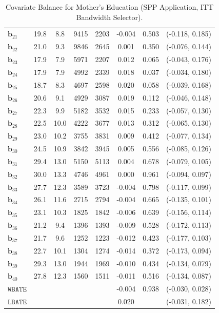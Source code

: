 \documentclass[10pt]{article}
\newcommand{\bb}{\mathbf{b}}
\begin{document}
\begin{table}[p]
\begin{tabular}{lccccccc}
   $\bb_{21}$ & 19.8 & 8.8 & 9415 & 2203 & -0.004 & 0.503 & (-0.118, 0.185)\\
   $\bb_{22}$ & 21.0 & 9.3 & 9846 & 2645 & 0.001 & 0.350 & (-0.076, 0.144)\\
   $\bb_{23}$ & 17.9 & 7.9 & 5971 & 2207 & 0.012 & 0.065 & (-0.043, 0.176)\\
   $\bb_{24}$ & 17.9 & 7.9 & 4992 & 2339 & 0.018 & 0.037 & (-0.034, 0.180)\\
   $\bb_{25}$ & 18.7 & 8.3 & 4697 & 2598 & 0.020 & 0.058 & (-0.039, 0.168)\\
   $\bb_{26}$ & 20.6 & 9.1 & 4929 & 3087 & 0.019 & 0.112 & (-0.046, 0.148)\\
   $\bb_{27}$ & 22.3 & 9.9 & 5182 & 3532 & 0.015 & 0.233 & (-0.057, 0.130)\\
   $\bb_{28}$ & 22.5 & 10.0 & 4222 & 3677 & 0.013 & 0.312 & (-0.065, 0.130)\\
   $\bb_{29}$ & 23.0 & 10.2 & 3755 & 3831 & 0.009 & 0.412 & (-0.077, 0.134)\\
   $\bb_{30}$ & 24.5 & 10.9 & 3842 & 3945 & 0.005 & 0.556 & (-0.085, 0.126)\\
   $\bb_{31}$ & 29.4 & 13.0 & 5150 & 5113 & 0.004 & 0.678 & (-0.079, 0.105)\\
   $\bb_{32}$ & 30.0 & 13.3 & 4746 & 4961 & 0.000 & 0.961 & (-0.094, 0.097)\\
   $\bb_{33}$ & 27.7 & 12.3 & 3589 & 3723 & -0.004 & 0.798 & (-0.117, 0.099)\\
   $\bb_{34}$ & 26.1 & 11.6 & 2715 & 2794 & -0.004 & 0.665 & (-0.135, 0.101)\\
   $\bb_{35}$ & 23.1 & 10.3 & 1825 & 1842 & -0.006 & 0.639 & (-0.156, 0.114)\\
   $\bb_{36}$ & 21.2 & 9.4 & 1396 & 1393 & -0.009 & 0.528 & (-0.172, 0.113)\\
   $\bb_{37}$ & 21.7 & 9.6 & 1252 & 1223 & -0.012 & 0.423 & (-0.177, 0.103)\\
   $\bb_{38}$ & 22.7 & 10.1 & 1304 & 1274 & -0.014 & 0.372 & (-0.173, 0.094)\\
   $\bb_{39}$ & 29.3 & 13.0 & 1944 & 1969 & -0.010 & 0.434 & (-0.134, 0.079)\\
   $\bb_{40}$ & 27.8 & 12.3 & 1560 & 1511 & -0.011 & 0.516 & (-0.134, 0.087)\\
  \midrule
   $\mathtt{WBATE}$ &  &  &  &  & -0.004 & 0.938 & (-0.030, 0.028)\\
  \midrule
   $\mathtt{LBATE}$ &  &  &  &  & 0.020 &  & (-0.031, 0.182)\\
  \bottomrule\bottomrule
\end{tabular}

    \caption{Covariate Balance for Mother's Education (SPP Application, ITT Bandwidth Selector).}
    \label{tab:sa-empapp_covbal_itt}
\end{table}
\end{document}
